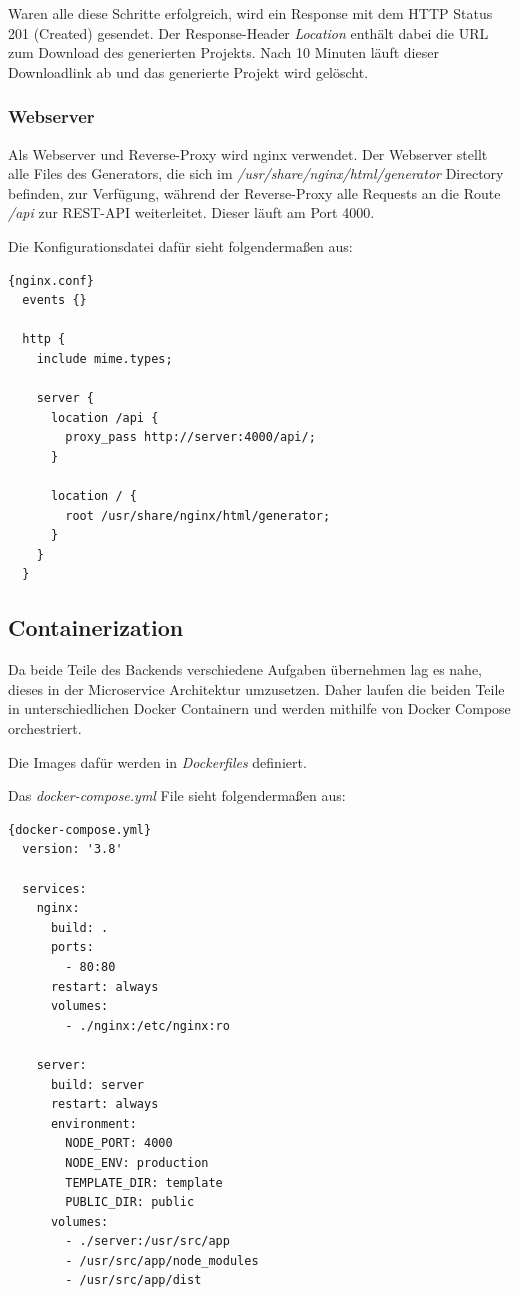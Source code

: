 Waren alle diese Schritte erfolgreich, wird ein Response mit dem HTTP Status 201 (Created)
gesendet.
Der Response-Header \textit{Location} enthält dabei die URL zum Download des generierten Projekts.
Nach 10 Minuten läuft dieser Downloadlink ab und das generierte Projekt wird gelöscht.

\subsubsection{Webserver}
Als Webserver und Reverse-Proxy wird nginx verwendet.
Der Webserver stellt alle Files des Generators, die sich im \textit{/usr/share/nginx/html/generator} Directory
befinden, zur Verfügung, während der Reverse-Proxy alle Requests an die Route \textit{/api} zur REST-API weiterleitet.
Dieser läuft am Port 4000.

Die Konfigurationsdatei dafür sieht folgendermaßen aus:

\begin{lstlisting}[label={lst:nginx.conf}]{nginx.conf}
  events {}

  http {
    include mime.types;

    server {
      location /api {
        proxy_pass http://server:4000/api/;
      }

      location / {
        root /usr/share/nginx/html/generator;
      }
    }
  }
\end{lstlisting}

\subsection{Containerization}
Da beide Teile des Backends verschiedene Aufgaben übernehmen lag es nahe, dieses in der Microservice
Architektur umzusetzen.
Daher laufen die beiden Teile in unterschiedlichen Docker Containern und werden mithilfe
von Docker Compose orchestriert.

Die Images dafür werden in \textit{Dockerfiles} definiert.

Das \textit{docker-compose.yml} File sieht folgendermaßen aus:

\begin{lstlisting}[label={lst:docker-compose.yml}]{docker-compose.yml}
  version: '3.8'

  services:
    nginx:
      build: .
      ports:
        - 80:80
      restart: always
      volumes:
        - ./nginx:/etc/nginx:ro

    server:
      build: server
      restart: always
      environment:
        NODE_PORT: 4000
        NODE_ENV: production
        TEMPLATE_DIR: template
        PUBLIC_DIR: public
      volumes:
        - ./server:/usr/src/app
        - /usr/src/app/node_modules
        - /usr/src/app/dist
\end{lstlisting}

